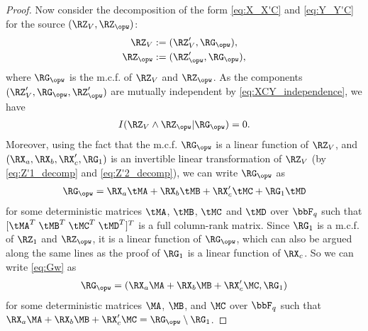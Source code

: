 \begin{proof}
Now consider the decomposition of the form \eqref{eq:X_X'C} and \eqref{eq:Y_Y'C} for the source  $(\RZ_V,\RZ_{\opw})$: 
\begin{align}
        \RZ_V &:= (\RZ'_V, \RG_{\opw}), \label{eq:ZV_decomp}\\
        \RZ_{\opw} &:= (\RZ'_{\opw} ,\RG_{\opw}),\label{eq:ZW_decomp}
\end{align}
where $\RG_{\opw}$ is the m.c.f. of $\RZ_V$ and $\RZ_{\opw}$. As the components $(\RZ'_V, \RG_{\opw}, \RZ'_{\opw})$ are mutually independent by \eqref{eq:XCY_independence}, we have 
\begin{align}
    I(\RZ_V \wedge \RZ_{\opw}|\RG_{\opw}) =0.\label{eq:Z'Zw'}
\end{align}
Moreover, using the fact that the m.c.f. $\RG_{\opw}$ is a linear function of $\RZ_V$, and $(\RX_a,\RX_b,\RX'_c,\RG_1)$ is an invertible linear transformation of $\RZ_V$ (by \eqref{eq:Z'1_decomp} and \eqref{eq:Z'2_decomp}),  we can  write $\RG_{\opw}$ as
\begin{align}
    \RG_{\opw} = \RX_a \tMA + \RX_b \tMB + \RX'_c \tMC +\RG_1\tMD \label{eq:Gw}
\end{align}
for some deterministic matrices $\tMA$, $\tMB$, $\tMC$ and $\tMD$ over $\bbF_q$ such that $[\tMA^T \; \tMB^T \; \tMC^T \; \tMD^T]^T$ is a full column-rank matrix.  Since $\RG_1$ is a m.c.f. of $\RZ_1$ and $\RZ_{\opw}$, it is a linear function of $\RG_{\opw}$, which can also be argued along the same lines as the proof of $\RG_1$ is a linear function of $\RX_c$. So we can write \eqref{eq:Gw} as 
\begin{align}
    \RG_{\opw} = (\RX_a \MA + \RX_b \MB + \RX'_c \MC, \RG_1) \label{eq:Gw_decompose}
\end{align}
for some deterministic matrices $\MA$, $\MB$, and $\MC$ over $\bbF_q$ such that $\RX_a \MA + \RX_b \MB + \RX'_c \MC = \RG_{\opw} \setminus \RG_1$. 


\end{proof}
